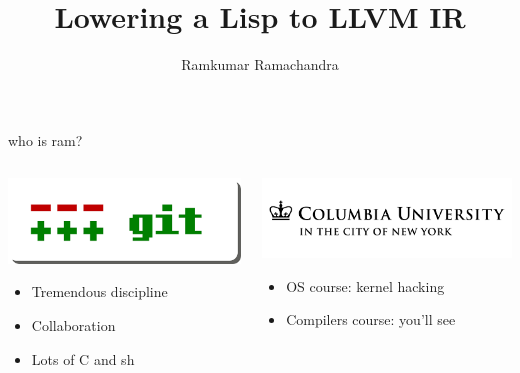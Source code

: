 \documentclass{beamer}
\title{Lowering a Lisp to LLVM IR}
\author{Ramkumar Ramachandra}
\begin{document}
\begin{frame}
  \titlepage
\end{frame}

\begin{frame}{who is ram?}
  \begin{columns}
    \begin{column}[b]{4.5cm}
      \includegraphics[scale=0.3]{git-logo}
      \begin{itemize}
      \item[] Tremendous discipline
      \item[] Collaboration
      \item[] Lots of C and sh
      \end{itemize}
    \end{column}
    \begin{column}[b]{5.5cm}
      \includegraphics[scale=0.4]{columbia-logo}
      \begin{itemize}
      \item[] OS course: kernel hacking
      \item[] Compilers course: you'll see
      \end{itemize}
    \end{column}
  \end{columns}
\end{frame}
\end{document}
